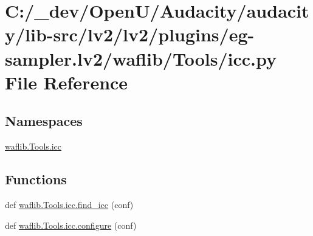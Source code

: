 \hypertarget{lv2_2plugins_2eg-sampler_8lv2_2waflib_2_tools_2icc_8py}{}\section{C\+:/\+\_\+dev/\+Open\+U/\+Audacity/audacity/lib-\/src/lv2/lv2/plugins/eg-\/sampler.lv2/waflib/\+Tools/icc.py File Reference}
\label{lv2_2plugins_2eg-sampler_8lv2_2waflib_2_tools_2icc_8py}
\subsection*{Namespaces}
\begin{DoxyCompactItemize}
\item 
 \hyperlink{namespacewaflib_1_1_tools_1_1icc}{waflib.\+Tools.\+icc}
\end{DoxyCompactItemize}
\subsection*{Functions}
\begin{DoxyCompactItemize}
\item 
def \hyperlink{namespacewaflib_1_1_tools_1_1icc_ac87401e53461cf3742295c6ca369977a}{waflib.\+Tools.\+icc.\+find\+\_\+icc} (conf)
\item 
def \hyperlink{namespacewaflib_1_1_tools_1_1icc_a29b371f4c4eaba47d7b198073638bfd9}{waflib.\+Tools.\+icc.\+configure} (conf)
\end{DoxyCompactItemize}
